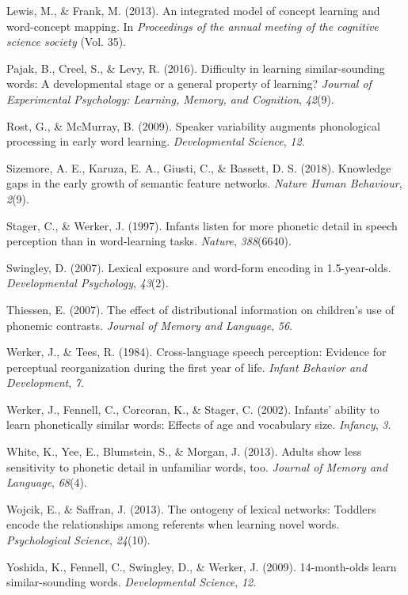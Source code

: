 \documentclass[10pt, letterpaper]{article}
\begin{document}
\hypertarget{ref-lewis2013}{}
Lewis, M., \& Frank, M. (2013). An integrated model of concept learning
and word-concept mapping. In \emph{Proceedings of the annual meeting of
the cognitive science society} (Vol. 35).

\hypertarget{ref-pajak2016}{}
Pajak, B., Creel, S., \& Levy, R. (2016). Difficulty in learning
similar-sounding words: A developmental stage or a general property of
learning? \emph{Journal of Experimental Psychology: Learning, Memory,
and Cognition}, \emph{42}(9).

\hypertarget{ref-rost2009}{}
Rost, G., \& McMurray, B. (2009). Speaker variability augments
phonological processing in early word learning. \emph{Developmental
Science}, \emph{12}.

\hypertarget{ref-sizemore2018}{}
Sizemore, A. E., Karuza, E. A., Giusti, C., \& Bassett, D. S. (2018).
Knowledge gaps in the early growth of semantic feature networks.
\emph{Nature Human Behaviour}, \emph{2}(9).

\hypertarget{ref-stager1997}{}
Stager, C., \& Werker, J. (1997). Infants listen for more phonetic
detail in speech perception than in word-learning tasks. \emph{Nature},
\emph{388}(6640).

\hypertarget{ref-swingley2007}{}
Swingley, D. (2007). Lexical exposure and word-form encoding in
1.5-year-olds. \emph{Developmental Psychology}, \emph{43}(2).

\hypertarget{ref-thiessen2007}{}
Thiessen, E. (2007). The effect of distributional information on
children's use of phonemic contrasts. \emph{Journal of Memory and
Language}, \emph{56}.

\hypertarget{ref-werker1984}{}
Werker, J., \& Tees, R. (1984). Cross-language speech perception:
Evidence for perceptual reorganization during the first year of life.
\emph{Infant Behavior and Development}, \emph{7}.

\hypertarget{ref-werker2002}{}
Werker, J., Fennell, C., Corcoran, K., \& Stager, C. (2002). Infants'
ability to learn phonetically similar words: Effects of age and
vocabulary size. \emph{Infancy}, \emph{3}.

\hypertarget{ref-white2013}{}
White, K., Yee, E., Blumstein, S., \& Morgan, J. (2013). Adults show
less sensitivity to phonetic detail in unfamiliar words, too.
\emph{Journal of Memory and Language}, \emph{68}(4).

\hypertarget{ref-wojcik2013}{}
Wojcik, E., \& Saffran, J. (2013). The ontogeny of lexical networks:
Toddlers encode the relationships among referents when learning novel
words. \emph{Psychological Science}, \emph{24}(10).

\hypertarget{ref-yoshida2009}{}
Yoshida, K., Fennell, C., Swingley, D., \& Werker, J. (2009).
14-month-olds learn similar-sounding words. \emph{Developmental
Science}, \emph{12}.
\end{document}
